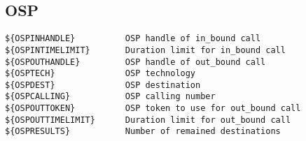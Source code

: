 \subsection{OSP}
\begin{verbatim}
${OSPINHANDLE}          OSP handle of in_bound call
${OSPINTIMELIMIT}       Duration limit for in_bound call
${OSPOUTHANDLE}         OSP handle of out_bound call
${OSPTECH}              OSP technology 
${OSPDEST}              OSP destination
${OSPCALLING}           OSP calling number
${OSPOUTTOKEN}          OSP token to use for out_bound call
${OSPOUTTIMELIMIT}      Duration limit for out_bound call
${OSPRESULTS}           Number of remained destinations
\end{verbatim}
